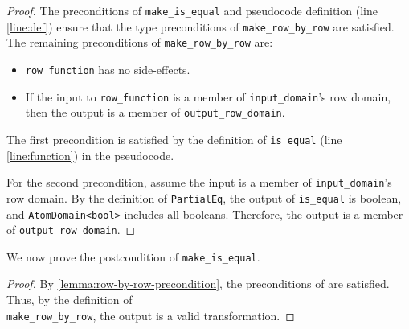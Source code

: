 \documentclass{article}
\begin{document}
\begin{proof}
    \label{lemma:row-by-row-precondition}
    The preconditions of \texttt{make\_is\_equal} and pseudocode definition (line \ref{line:def}) ensure that the type preconditions of \texttt{make\_row\_by\_row} are satisfied.
    The remaining preconditions of \texttt{make\_row\_by\_row} are:
    \begin{itemize}
        \item \texttt{row\_function} has no side-effects.
        \item If the input to \texttt{row\_function} is a member of \texttt{input\_domain}'s row domain, then the output is a member of \texttt{output\_row\_domain}.
    \end{itemize}

    The first precondition is satisfied by the definition of \texttt{is\_equal} (line \ref{line:function}) in the pseudocode.

    For the second precondition, assume the input is a member of \texttt{input\_domain}'s row domain.
    By the definition of \texttt{PartialEq}, the output of \texttt{is\_equal} is boolean, and \texttt{AtomDomain<bool>} includes all booleans.
    Therefore, the output is a member of \texttt{output\_row\_domain}.
\end{proof}

We now prove the postcondition of \texttt{make\_is\_equal}.
\begin{proof}
By \ref{lemma:row-by-row-precondition}, the preconditions of  are satisfied.
Thus, by the definition of \\\texttt{make\_row\_by\_row}, the output is a valid transformation.
\end{proof}
\end{document}
